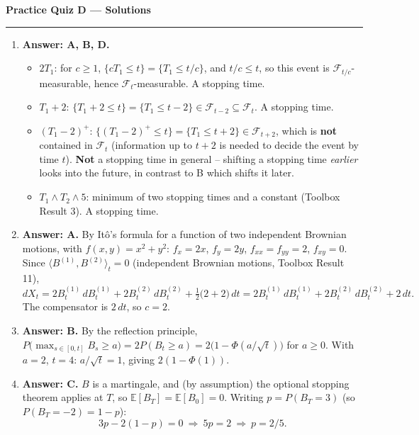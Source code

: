 \documentclass[11pt]{article}
\newcommand{\E}{\mathbb{E}}
\newcommand{\ans}[1]{\par\noindent\textbf{\color{blue!50!black}Answer: #1}}
\begin{document}
\begin{center}
{\LARGE\bfseries Practice Quiz D --- Solutions}
\end{center}
\vspace{6pt}
\hrule
\vspace{10pt}

\begin{enumerate}

\item[\textbf{Q1.}] \ans{A, B, D.}
\begin{itemize}[nosep]
\item[A] $2T_1$: for $c\ge1$, $\{cT_1\le t\}=\{T_1\le t/c\}$, and $t/c\le t$, so this event is $\mathcal F_{t/c}$-measurable, hence $\mathcal F_t$-measurable. A stopping time.
\item[B] $T_1+2$: $\{T_1+2\le t\}=\{T_1\le t-2\}\in\mathcal F_{t-2}\subseteq\mathcal F_t$. A stopping time.
\item[C] $(T_1-2)^+$: $\{(T_1-2)^+\le t\}=\{T_1\le t+2\}\in\mathcal F_{t+2}$, which is \textbf{not} contained in $\mathcal F_t$ (information up to $t+2$ is needed to decide the event by time $t$). \textbf{Not} a stopping time in general -- shifting a stopping time \emph{earlier} looks into the future, in contrast to B which shifts it later.
\item[D] $T_1\wedge T_2\wedge5$: minimum of two stopping times and a constant (Toolbox Result 3). A stopping time.
\end{itemize}

\item[\textbf{Q2.}] \ans{A.} By It\^o's formula for a function of two independent Brownian motions, with $f(x,y)=x^2+y^2$: $f_x=2x$, $f_y=2y$, $f_{xx}=f_{yy}=2$, $f_{xy}=0$. Since $\langle B^{(1)},B^{(2)}\rangle_t=0$ (independent Brownian motions, Toolbox Result 11),
\[
dX_t=2B^{(1)}_t\,dB^{(1)}_t+2B^{(2)}_t\,dB^{(2)}_t+\tfrac12\big(2+2\big)\,dt=2B^{(1)}_t\,dB^{(1)}_t+2B^{(2)}_t\,dB^{(2)}_t+2\,dt.
\]
The compensator is $2\,dt$, so $c=2$.

\item[\textbf{Q3.}] \ans{B.} By the reflection principle, $P\big(\max_{s\in[0,t]}B_s\ge a\big)=2P(B_t\ge a)=2\big(1-\Phi(a/\sqrt t)\big)$ for $a\ge0$. With $a=2$, $t=4$: $a/\sqrt t=1$, giving $2(1-\Phi(1))$.

\item[\textbf{Q4.}] \ans{C.} $B$ is a martingale, and (by assumption) the optional stopping theorem applies at $T$, so $\E[B_T]=\E[B_0]=0$. Writing $p=P(B_T=3)$ (so $P(B_T=-2)=1-p$):
\[
3p-2(1-p)=0\ \Longrightarrow\ 5p=2\ \Longrightarrow\ p=2/5.
\]


\end{enumerate}
\end{document}

